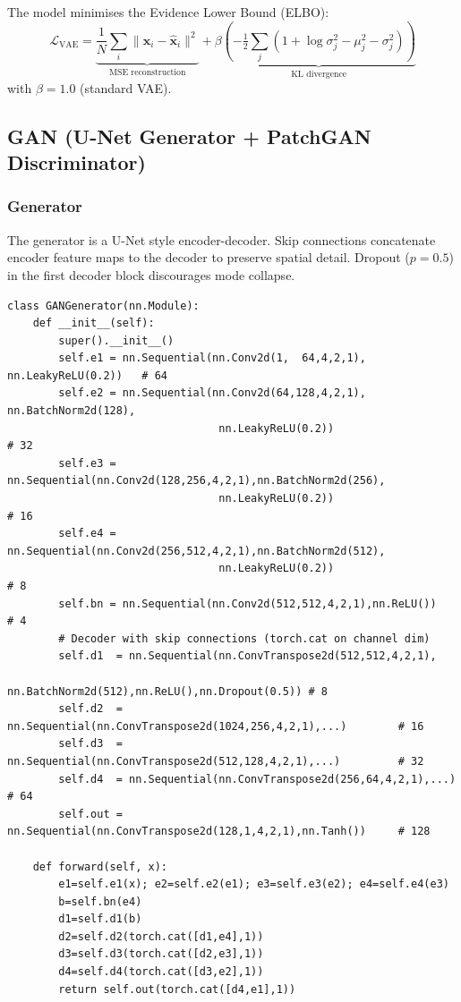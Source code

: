 \documentclass[12pt,a4paper]{article}
\begin{document}
The model minimises the Evidence Lower Bound (ELBO):
\begin{equation}
\mathcal{L}_{\text{VAE}}
= \underbrace{\frac{1}{N}\sum_{i}\|\mathbf{x}_i-\hat{\mathbf{x}}_i\|^2}_{\text{MSE reconstruction}}
+ \beta\underbrace{\!\left(-\tfrac{1}{2}\sum_{j}(1+\log\sigma_j^2-\mu_j^2-\sigma_j^2)\right)}_{\text{KL divergence}}
\label{eq:elbo}
\end{equation}
with $\beta=1.0$ (standard VAE).

\subsection{GAN (U-Net Generator + PatchGAN Discriminator)}

\subsubsection{Generator}

The generator is a U-Net style encoder-decoder.  Skip connections concatenate encoder feature
maps to the decoder to preserve spatial detail.  Dropout ($p=0.5$) in the first decoder block
discourages mode collapse.

\begin{lstlisting}[caption={GAN Generator (U-Net style, abbreviated)}]
class GANGenerator(nn.Module):
    def __init__(self):
        super().__init__()
        self.e1 = nn.Sequential(nn.Conv2d(1,  64,4,2,1), nn.LeakyReLU(0.2))   # 64
        self.e2 = nn.Sequential(nn.Conv2d(64,128,4,2,1), nn.BatchNorm2d(128),
                                 nn.LeakyReLU(0.2))                              # 32
        self.e3 = nn.Sequential(nn.Conv2d(128,256,4,2,1),nn.BatchNorm2d(256),
                                 nn.LeakyReLU(0.2))                              # 16
        self.e4 = nn.Sequential(nn.Conv2d(256,512,4,2,1),nn.BatchNorm2d(512),
                                 nn.LeakyReLU(0.2))                              # 8
        self.bn = nn.Sequential(nn.Conv2d(512,512,4,2,1),nn.ReLU())             # 4
        # Decoder with skip connections (torch.cat on channel dim)
        self.d1  = nn.Sequential(nn.ConvTranspose2d(512,512,4,2,1),
                                  nn.BatchNorm2d(512),nn.ReLU(),nn.Dropout(0.5)) # 8
        self.d2  = nn.Sequential(nn.ConvTranspose2d(1024,256,4,2,1),...)        # 16
        self.d3  = nn.Sequential(nn.ConvTranspose2d(512,128,4,2,1),...)         # 32
        self.d4  = nn.Sequential(nn.ConvTranspose2d(256,64,4,2,1),...)          # 64
        self.out = nn.Sequential(nn.ConvTranspose2d(128,1,4,2,1),nn.Tanh())     # 128

    def forward(self, x):
        e1=self.e1(x); e2=self.e2(e1); e3=self.e3(e2); e4=self.e4(e3)
        b=self.bn(e4)
        d1=self.d1(b)
        d2=self.d2(torch.cat([d1,e4],1))
        d3=self.d3(torch.cat([d2,e3],1))
        d4=self.d4(torch.cat([d3,e2],1))
        return self.out(torch.cat([d4,e1],1))
\end{lstlisting}
\end{document}
